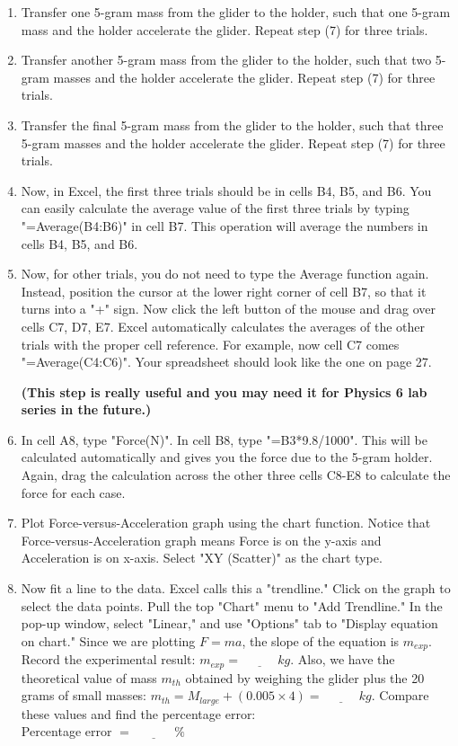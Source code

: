 \documentclass{article}
\begin{document}
\begin{enumerate}
\item Transfer one 5-gram mass from the glider to the holder, such that one 5-gram mass and the holder accelerate the glider. Repeat step (7) for three trials.

\item Transfer another 5-gram mass from the glider to the holder, such that two 5-gram masses and the holder accelerate the glider. Repeat step (7) for three trials.

\item Transfer the final 5-gram mass from the glider to the holder, such that three 5-gram masses and the holder accelerate the glider. Repeat step (7) for three trials.

\item Now, in Excel, the first three trials should be in cells B4, B5, and B6. You can easily calculate the average value of the first three trials by typing "=Average(B4:B6)" in cell B7. This operation will average the numbers in cells B4, B5, and B6. 

\item Now, for other trials, you do not need to type the Average function again. Instead, position the cursor at the lower right corner of cell B7, so that it turns into a "+" sign. Now click the left button of the mouse and drag over cells C7, D7, E7. Excel automatically calculates the averages of the other trials with the proper cell reference. For example, now cell C7 comes "=Average(C4:C6)". Your spreadsheet should look like the one on page 27.

{\bf (This step is really useful and you may need it for Physics 6 lab series in the future.)}

\item In cell A8, type "Force(N)". In cell B8, type "=B3*9.8/1000". This will be calculated automatically and gives you the force due to the 5-gram holder. Again, drag the calculation across the other three cells C8-E8 to calculate the force for each case.

\item Plot Force-versus-Acceleration graph using the chart function. Notice that 
Force-versus-Acceleration graph means Force is on the y-axis and Acceleration is on x-axis. Select "XY (Scatter)" as the chart type.

\item Now fit a line to the data. Excel calls this a "trendline." Click on the graph to select the data points. Pull the top "Chart" menu to "Add Trendline." In the pop-up window, select "Linear," and use "Options" tab to "Display equation on chart." Since we are plotting $F=ma$, the slope of the equation is $m_{exp}$. Record the experimental result: $m_{exp}=\underline{~~~~~~~~~~~~~}kg$. Also, we have the theoretical value of mass $m_{th}$ obtained by weighing the glider plus the 20 grams of small masses:
$m_{th}=M_{large}+(0.005\times 4)=\underline{~~~~~~~~~~~~~}kg$. Compare these values and find the percentage error: \\ Percentage error $=\underline{~~~~~~~~~~~~~~~}\% $ 

\end{enumerate}
\end{document}
